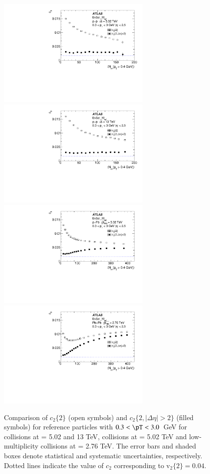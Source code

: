 \documentclass[cernpreprint,texlive=2014,txfonts,UKenglish]{latex/atlasdoc}
\begin{document}
\begin{figure}[ht!]
\begin{center}
\includegraphics[width=75mm]{fig_04a.pdf}
\includegraphics[width=75mm]{fig_04b.pdf}
\includegraphics[width=75mm]{fig_04c.pdf}
\includegraphics[width=75mm]{fig_04d.pdf}
\caption{Comparison of $c_2\{2\}$ (open symbols) and  $c_2\{2,|\Delta\eta|>2\}$ (filled symbols) for reference particles with $0.3< \pT < 3.0$~GeV for \pp collisions at \sqs= 5.02 and 13 TeV, \pPb collisions at \sqn= 5.02 TeV and low-multiplicity \PbPb collisions at \sqn= 2.76 TeV.   The error bars  and shaded boxes denote statistical and systematic uncertainties, respectively.  Dotted lines indicate the value of $c_2$ corresponding to $\mathrm{v}_2\{2\}= 0.04$.}
\label{fig:EtaGap} 
\end{center}
\end{figure} 
\end{document}
